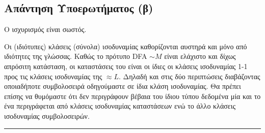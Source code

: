 \subsection{Απάντηση Υποερωτήματος (β)}
\label{ssec:Solution_4.2}
\doublespacing
Ο ισχυρισμός είναι σωστός.

\begin{tcolorbox}[colback=yellow!15!white, colframe=blue!50!white,
	fonttitle=\bfseries\Large, title = Αιτιολόγηση]

Οι (ιδιότυπες) κλάσεις (σύνολα) ισοδυναμίας καθορίζονται αυστηρά και μόνο από ιδιότητες της γλώσσας.
Καθώς το πρότυπο DFA $\sim\!\!\!{M}$ είναι ελάχιστο και δίχως απρόσιτη κατάσταση, οι καταστάσεις του είναι οι ίδιες
οι κλάσεις ισοδυναμίας 1-1 προς τις κλάσεις ισοδυναμίας της $\approx\!\!{L}$. Δηλαδή και στις
δύο περιπτώσεις διαβάζοντας οποιαδήποτε συμβολοσειρά οδηγούμαστε σε ίδια κλάση ισοδυναμίας. Θα πρέπει επίσης να
θυμόμαστε ότι δεν περιγράφουν βέβαια του ίδιου τύπου δεδομένα μία και το
ένα περιγράφεται από κλάσεις ισοδυναμίας καταστάσεων ενώ το άλλο κλάσεις ισοδυναμίας συμβολοσειρών.

\end{tcolorbox}

\begin{center}
	\noindent\rule{\linewidth}{0.5pt}
\end{center}
\clearpage
